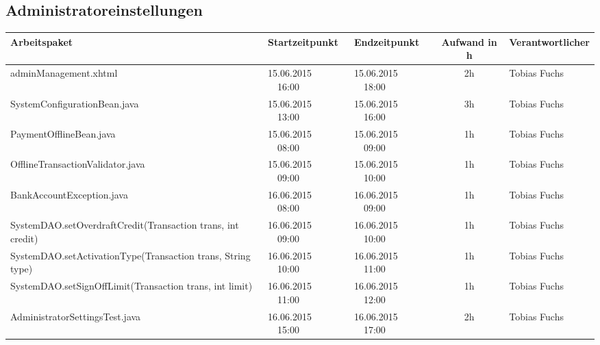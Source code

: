 \begin{landscape}
	\subsection{Administratoreinstellungen}
	\begin{tabular}{|p{10.3cm}|p{3.2cm}|p{3.2cm}|c|p{3.5cm}|}
		\hline  \textbf{Arbeitspaket} & \textbf{Startzeitpunkt} & \textbf{Endzeitpunkt} & \textbf{Aufwand in h} & \textbf{Verantwortlicher} \\ 
		\hline   adminManagement.xhtml                                 & 15.06.2015 \ \ 16:00       & 15.06.2015  \ \  18:00      &  2h                & Tobias Fuchs\\
		\hline   SystemConfigurationBean.java                          & 15.06.2015 \ \ 13:00       & 15.06.2015  \ \  16:00      &  3h                & Tobias Fuchs\\
		\hline   PaymentOfflineBean.java                               & 15.06.2015 \ \ 08:00       & 15.06.2015  \ \  09:00      &  1h                & Tobias Fuchs\\
		\hline   OfflineTransactionValidator.java                      & 15.06.2015 \ \ 09:00       & 15.06.2015  \ \  10:00      &  1h                & Tobias Fuchs\\
		\hline   BankAccountException.java                             & 16.06.2015 \ \ 08:00       & 16.06.2015  \ \  09:00      &  1h                & Tobias Fuchs\\
		\hline   SystemDAO.setOverdraftCredit(Transaction trans, int credit)  & 16.06.2015 \ \ 09:00       & 16.06.2015  \ \  10:00      &  1h                & Tobias Fuchs\\
		\hline   SystemDAO.setActivationType(Transaction trans, String type)  & 16.06.2015 \ \ 10:00       & 16.06.2015  \ \  11:00      &  1h                & Tobias Fuchs\\
		\hline   SystemDAO.setSignOffLimit(Transaction trans, int limit)      & 16.06.2015 \ \ 11:00       & 16.06.2015  \ \  12:00      &  1h                & Tobias Fuchs\\
		\hline  AdministratorSettingsTest.java     & 16.06.2015 \ \ 15:00       & 16.06.2015  \ \  17:00      &  2h                & Tobias Fuchs\\
		\hline 
	\end{tabular} \ \\
	\ \\
	

\end{landscape}
